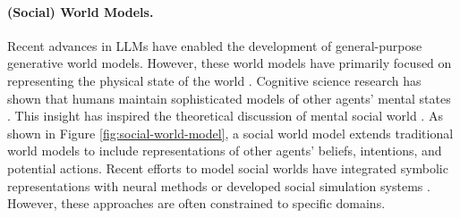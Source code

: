 \paragraph{(Social) World Models.}
\label{subsec:social-world-models}
Recent advances in LLMs have enabled the development of general-purpose generative world models.
However, these world models have primarily focused on representing the physical state of the world \citep{xiang2024pandorageneralworldmodel, huang2022innermonologueembodiedreasoning, ding2024understandingworldpredictingfuture, liu2025worldmodelmillionlengthvideo}. 
Cognitive science research has shown that humans maintain sophisticated models of other agents' mental states \citep{sap2023neuraltheoryofmindlimitssocial, jara-ettinger2024traces}. 
This insight has inspired the theoretical discussion of mental social world \citep{hinsz1995mental, ding2024understandingworldpredictingfuture}. 
As shown in Figure \ref{fig:social-world-model}, a social world model extends traditional world models to include representations of other agents' beliefs, intentions, and potential actions.
Recent efforts to model social worlds have integrated symbolic representations with neural methods \citep{Dong2023CoRRPUS,martin2021thesis,zhang2025autotomautomatedbayesianinverse} or developed social simulation systems \citep{park2023generativeagentsinteractivesimulacra, 10.1145/3526113.3545616}. 
However, these approaches are often constrained to specific domains.




